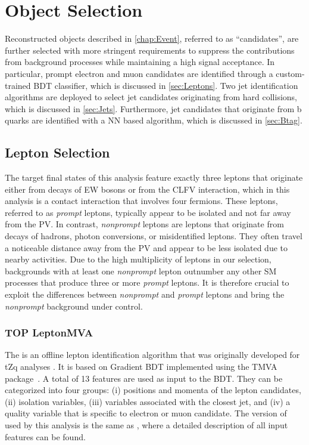 \chapter{Object Selection}
\label{chap:Objects}

Reconstructed objects described in \autoref{chap:Event}, referred to as ``candidates'', are further selected with more stringent requirements to suppress the contributions from background processes while maintaining a high signal acceptance. In particular, prompt electron and muon candidates are identified through a custom-trained \ac{BDT} classifier, which is discussed in \autoref{sec:Leptons}. Two jet identification algorithms are deployed to select jet candidates originating from hard collisions, which is discussed in \autoref{sec:Jets}. Furthermore, jet candidates that originate from b quarks are identified with a \ac{NN} based algorithm, which is discussed in \autoref{sec:Btag}. 
\section{Lepton Selection}
\label{sec:Leptons}

The target final states of this analysis feature exactly three leptons that originate either from decays of \ac{EW} bosons or from the \ac{CLFV} interaction, which in this analysis is a contact interaction that involves four fermions. These leptons, referred to as \emph{prompt} leptons, typically appear to be isolated and not far away from the \ac{PV}. In contrast, \emph{nonprompt} leptons are leptons that originate from decays of hadrons, photon conversions, or misidentified leptons. They often travel a noticeable distance away from the \ac{PV} and appear to be less isolated due to nearby activities. Due to the high multiplicity of leptons in our selection, backgrounds with at least one \emph{nonprompt} lepton outnumber any other \ac{SM} processes that produce three or more \emph{prompt} leptons. It is therefore crucial to exploit the differences between \emph{nonprompt} and \emph{prompt} leptons and bring the \emph{nonprompt} background under control. 
\subsection{TOP LeptonMVA}
\label{subsec:TOPMVA}

The \TOP is an offline lepton identification algorithm that was originally developed for tZq analyses \cite{CMS:2018sgc,CMS:2021ugv}. It is based on Gradient \ac{BDT} implemented using the TMVA package~\cite{TMVA:2007ngy}. A total of 13 features are used as input to the \ac{BDT}. They can be categorized into four groups: (i) positions and momenta of the lepton candidates, (ii) isolation variables, (iii) variables associated with the closest jet, and (iv) a quality variable that is specific to electron or muon candidate. The version of \TOP used by this analysis is the same as \cite{CMS:2021ugv}, where a detailed description of all input features can be found.

